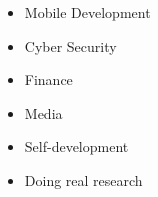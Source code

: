 \begin{itemize}
\item Mobile Development
\item Cyber Security
\item Finance
\item Media

\end{itemize}
\begin{itemize}
\item Self-development
\item Doing real research

\end{itemize}